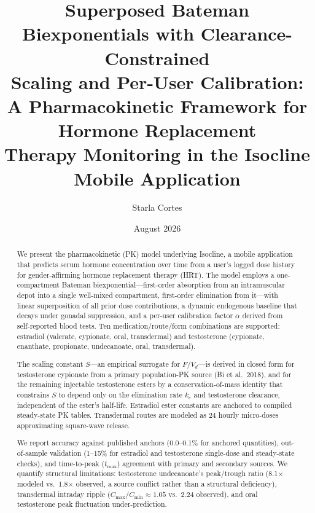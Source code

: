 \documentclass[11pt,a4paper]{article}
\title{\textbf{Superposed Bateman Biexponentials with Clearance-Constrained\\
Scaling and Per-User Calibration:}\\[0.3em]
\large A Pharmacokinetic Framework for Hormone Replacement\\
Therapy Monitoring in the Isocline Mobile Application}
\author{Starla Cortes}
\date{August 2026}
\begin{document}
\maketitle

\begin{abstract}
\noindent
We present the pharmacokinetic (PK) model underlying Isocline, a mobile
application that predicts serum hormone concentration over time from a
user's logged dose history for gender-affirming hormone replacement
therapy (HRT). The model employs a one-compartment Bateman
biexponential---first-order absorption from an intramuscular depot into a
single well-mixed compartment, first-order elimination from it---with
linear superposition of all prior dose contributions, a dynamic
endogenous baseline that decays under gonadal suppression, and a
per-user calibration factor $\alpha$ derived from self-reported blood
tests. Ten medication/route/form combinations are supported: estradiol
(valerate, cypionate, oral, transdermal) and testosterone (cypionate,
enanthate, propionate, undecanoate, oral, transdermal).

The scaling constant $S$---an empirical surrogate for $F/V_d$---is
derived in closed form for testosterone cypionate from a primary
population-PK source (Bi et al.\ 2018), and for the remaining injectable
testosterone esters by a conservation-of-mass identity that constrains
$S$ to depend only on the elimination rate $k_e$ and testosterone
clearance, independent of the ester's half-life. Estradiol ester
constants are anchored to compiled steady-state PK tables. Transdermal
routes are modeled as 24 hourly micro-doses approximating square-wave
release.

We report accuracy against published anchors (0.0--0.1\% for anchored
quantities), out-of-sample validation (1--15\% for estradiol and
testosterone single-dose and steady-state checks), and time-to-peak
($t_{\max}$) agreement with primary and secondary sources. We
quantify structural limitations: testosterone undecanoate's peak/trough
ratio (8.1$\times$ modeled vs.\ 1.8$\times$ observed, a source conflict
rather than a structural deficiency), transdermal intraday ripple
($C_{\max}/C_{\min} \approx 1.05$ vs.\ 2.24 observed), and oral
testosterone peak fluctuation under-prediction.


\end{abstract}
\end{document}
